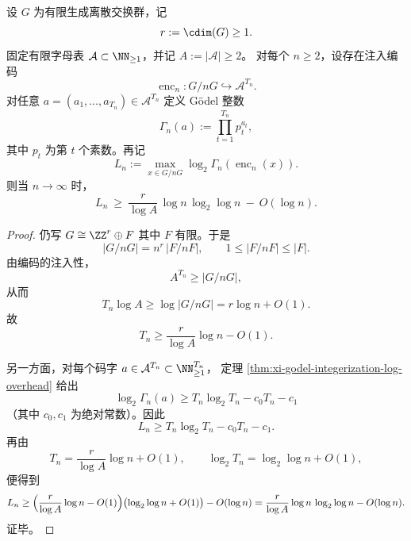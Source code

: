 \begin{theorem}\label{thm:xi-finite-quotient-scalar-godel-loglog-overhead}
设 \(G\) 为有限生成离散交换群，记
\[
r:=\cdim(G)\ge 1.
\]
固定有限字母表 \(\mathcal A\subset \NN_{\ge 1}\)，并记 \(A:=|\mathcal A|\ge 2\)。
对每个 \(n\ge 2\)，设存在注入编码
\[
\operatorname{enc}_n:G/nG\hookrightarrow \mathcal A^{T_n}.
\]
对任意
\(
a=(a_1,\dots,a_{T_n})\in \mathcal A^{T_n}
\)
定义 Gödel 整数
\[
\Gamma_n(a):=\prod_{t=1}^{T_n}p_t^{a_t},
\]
其中 \(p_t\) 为第 \(t\) 个素数。再记
\[
L_n:=\max_{x\in G/nG}\log_2\Gamma_n(\operatorname{enc}_n(x)).
\]
则当 \(n\to\infty\) 时，
\[
L_n\ \ge\ \frac{r}{\log A}\,\log n\,\log_2\log n\ -\ O(\log n).
\]
\end{theorem}
\begin{proof}
仍写
\(
G\cong \ZZ^r\oplus F
\)
其中 \(F\) 有限。于是
\[
|G/nG|=n^r\,|F/nF|,
\qquad
1\le |F/nF|\le |F|.
\]
由编码的注入性，
\[
A^{T_n}\ge |G/nG|,
\]
从而
\[
T_n\log A\ge \log|G/nG|=r\log n+O(1).
\]
故
\[
T_n\ge \frac{r}{\log A}\log n-O(1).
\]

另一方面，对每个码字 \(a\in\mathcal A^{T_n}\subset \NN_{\ge 1}^{T_n}\)，
定理 \ref{thm:xi-godel-integerization-log-overhead} 给出
\[
\log_2\Gamma_n(a)\ge T_n\log_2 T_n-c_0T_n-c_1
\]
（其中 \(c_0,c_1\) 为绝对常数）。因此
\[
L_n\ge T_n\log_2 T_n-c_0T_n-c_1.
\]
再由
\[
T_n=\frac{r}{\log A}\log n+O(1),
\qquad
\log_2 T_n=\log_2\log n+O(1),
\]
便得到
\[
L_n
\ge
\Bigl(\frac{r}{\log A}\log n-O(1)\Bigr)\bigl(\log_2\log n+O(1)\bigr)-O(\log n)
=
\frac{r}{\log A}\log n\,\log_2\log n-O(\log n).
\]
证毕。
\end{proof}

